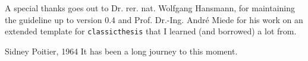 A special thanks goes out to Dr. rer. nat. Wolfgang Hansmann, for maintaining the guideline up to version 0.4 and Prof. Dr.-Ing. André Miede for his work on an extended template for \texttt{classicthesis} that I learned (and borrowed) a lot from.

\begin{bigquote}{Sidney Poitier, 1964}
It has been a long journey to this moment.
\end{bigquote}
